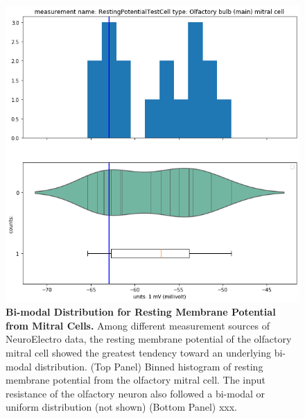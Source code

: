 \begin{figure}  
\begin{center}     
  \includegraphics[scale=0.8]{chapters/notebooks_converted/needata_thesis_files/needata_thesis_5_22}
      \caption[Bi-modal Distribution for Resting Membrane Potential from Mitral Cells]{\textbf{Bi-modal Distribution for Resting Membrane Potential from Mitral Cells.} Among different measurement sources of NeuroElectro data, the resting membrane potential of the olfactory mitral cell showed the greatest tendency toward an underlying bi-modal distribution. (Top Panel) Binned histogram of resting membrane potential from the olfactory mitral cell. The input resistance of the olfactory neuron also followed a bi-modal or uniform distribution (not shown) (Bottom Panel) xxx. 
      }
      \label{fig:bimodal-feature}
\end{center}     
\end{figure}
%
    
